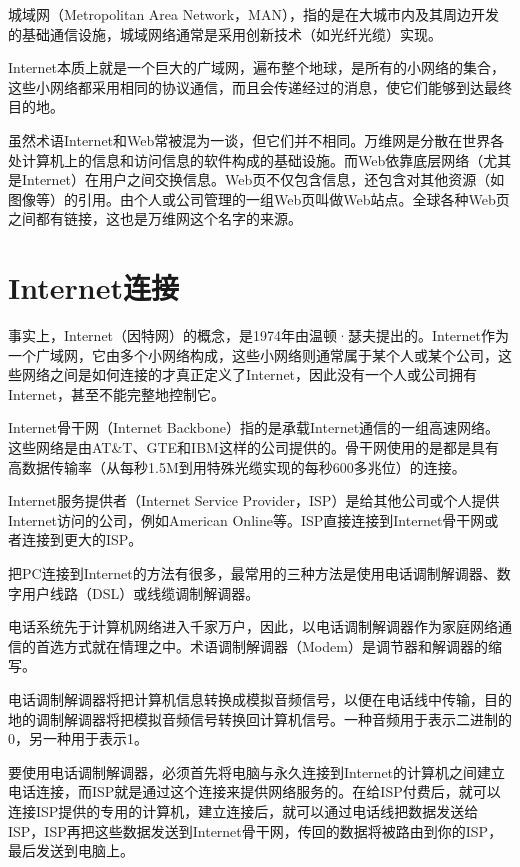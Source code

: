 城域网（Metropolitan Area Network，MAN），指的是在大城市内及其周边开发的基础通信设施，城域网络通常是采用创新技术（如光纤光缆）实现。


Internet本质上就是一个巨大的广域网，遍布整个地球，是所有的小网络的集合，这些小网络都采用相同的协议通信，而且会传递经过的消息，使它们能够到达最终目的地。

虽然术语Internet和Web常被混为一谈，但它们并不相同。万维网是分散在世界各处计算机上的信息和访问信息的软件构成的基础设施。而Web依靠底层网络（尤其是Internet）在用户之间交换信息。Web页不仅包含信息，还包含对其他资源（如图像等）的引用。由个人或公司管理的一组Web页叫做Web站点。全球各种Web页之间都有链接，这也是万维网这个名字的来源。




\section{Internet连接}


事实上，Internet（因特网）的概念，是1974年由温顿·瑟夫提出的。Internet作为一个广域网，它由多个小网络构成，这些小网络则通常属于某个人或某个公司，这些网络之间是如何连接的才真正定义了Internet，因此没有一个人或公司拥有Internet，甚至不能完整地控制它。


Internet骨干网（Internet Backbone）指的是承载Internet通信的一组高速网络。这些网络是由AT\&T、GTE和IBM这样的公司提供的。骨干网使用的是都是具有高数据传输率（从每秒1.5M到用特殊光缆实现的每秒600多兆位）的连接。

Internet服务提供者（Internet Service Provider，ISP）是给其他公司或个人提供Internet访问的公司，例如American Online等。ISP直接连接到Internet骨干网或者连接到更大的ISP。

把PC连接到Internet的方法有很多，最常用的三种方法是使用电话调制解调器、数字用户线路（DSL）或线缆调制解调器。

电话系统先于计算机网络进入千家万户，因此，以电话调制解调器作为家庭网络通信的首选方式就在情理之中。术语调制解调器（Modem）是调节器和解调器的缩写。


电话调制解调器将把计算机信息转换成模拟音频信号，以便在电话线中传输，目的地的调制解调器将把模拟音频信号转换回计算机信号。一种音频用于表示二进制的0，另一种用于表示1。

要使用电话调制解调器，必须首先将电脑与永久连接到Internet的计算机之间建立电话连接，而ISP就是通过这个连接来提供网络服务的。在给ISP付费后，就可以连接ISP提供的专用的计算机，建立连接后，就可以通过电话线把数据发送给ISP，ISP再把这些数据发送到Internet骨干网，传回的数据将被路由到你的ISP，最后发送到电脑上。

